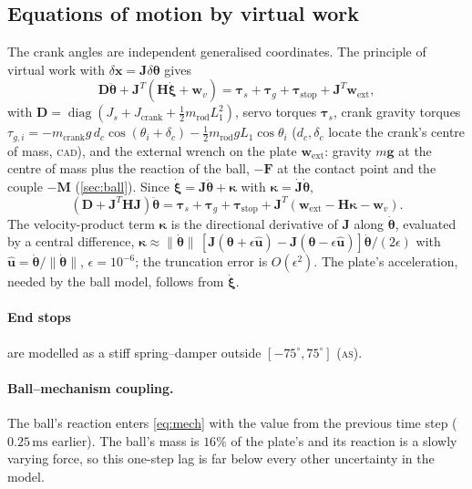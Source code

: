 \documentclass[10pt,a4paper]{article}
\newcommand{\un}[1]{\,\mathrm{#1}}
\newcommand{\vect}[1]{\bm{#1}}
\newcommand{\tagCAD}{\textsc{cad}}
\newcommand{\tagAS}{\textsc{as}}
\begin{document}
\subsection{Equations of motion by virtual work}
The crank angles are independent generalised coordinates. The principle of virtual work
\citep{tsai2000solving,tsai1999robot} with $\delta\vect x=\vect J\delta\vect\theta$ gives
\begin{equation}
  \vect D\ddot{\vect\theta}+\vect J^T\!\left(\vect H\dot{\vect\xi}+\vect w_v\right)
  =\vect\tau_s+\vect\tau_g+\vect\tau_{\mathrm{stop}}+\vect J^T\vect w_{\mathrm{ext}},
\end{equation}
with $\vect D=\operatorname{diag}(J_s+J_{\mathrm{crank}}+\tfrac12m_{\mathrm{rod}}L_1^2)$, servo
torques $\vect\tau_s$, crank gravity torques
$\tau_{g,i}=-m_{\mathrm{crank}}g\,d_c\cos(\theta_i+\delta_c)-\tfrac12m_{\mathrm{rod}}gL_1\cos\theta_i$
($d_c,\delta_c$ locate the crank's centre of mass, \tagCAD), and the external wrench on the plate
$\vect w_{\mathrm{ext}}$: gravity $m\vect g$ at the centre of mass plus the reaction of the ball,
$-\vect F$ at the contact point and the couple $-\vect M$ (\cref{sec:ball}). Since
$\dot{\vect\xi}=\vect J\ddot{\vect\theta}+\vect\kappa$ with $\vect\kappa=\dot{\vect J}\dot{\vect\theta}$,
\begin{equation}
  \left(\vect D+\vect J^T\vect H\vect J\right)\ddot{\vect\theta}
  =\vect\tau_s+\vect\tau_g+\vect\tau_{\mathrm{stop}}+\vect J^T\!\left(\vect w_{\mathrm{ext}}-\vect H\vect\kappa-\vect w_v\right).
  \label{eq:mech}
\end{equation}
The velocity-product term $\vect\kappa$ is the directional derivative of $\vect J$ along
$\dot{\vect\theta}$, evaluated by a central difference,
$\vect\kappa\approx\lVert\dot{\vect\theta}\rVert\,[\vect J(\vect\theta+\epsilon\hat{\vect u})-\vect J(\vect\theta-\epsilon\hat{\vect u})]\dot{\vect\theta}/(2\epsilon)$
with $\hat{\vect u}=\dot{\vect\theta}/\lVert\dot{\vect\theta}\rVert$, $\epsilon=10^{-6}$; the
truncation error is $O(\epsilon^2)$. The plate's acceleration, needed by the ball model,
follows from $\dot{\vect\xi}$.

\paragraph{End stops} are modelled as a stiff spring--damper outside
$[-75^\circ,75^\circ]$ (\tagAS).

\paragraph{Ball--mechanism coupling.} The ball's reaction enters \eqref{eq:mech} with the value
from the previous time step ($0.25\un{ms}$ earlier). The ball's mass is $16\%$ of the plate's and
its reaction is a slowly varying force, so this one-step lag is far below every other
uncertainty in the model.
\end{document}

